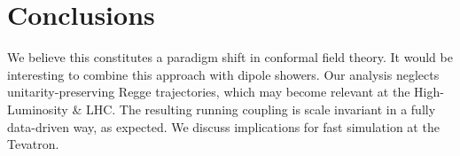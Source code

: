\section{Conclusions}\label{sec:conclusions}

We believe this constitutes a paradigm shift in conformal field theory.
It would be interesting to combine this approach with dipole showers.
Our analysis neglects unitarity-preserving Regge trajectories, which may
become relevant at the High-Luminosity & LHC. The resulting running
coupling is scale invariant in a fully data-driven way, as expected. We
discuss implications for fast simulation at the Tevatron.

